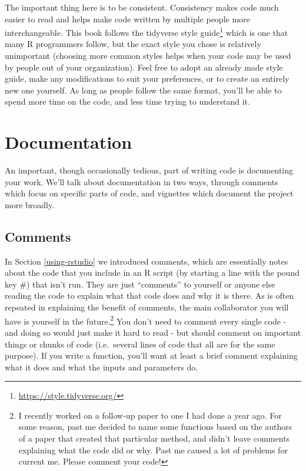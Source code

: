 \documentclass[
]{krantz}
\renewcommand{\href}[2]{#2\footnote{\url{#1}}}
\begin{document}
The important thing here is to be consistent. Consistency makes code much easier to read and helps make code written by multiple people more interchangeable. This book follows the \href{https://style.tidyverse.org/}{tidyverse style guide} which is one that many R programmers follow, but the exact style you chose is relatively unimportant (choosing more common styles helps when your code may be used by people out of your organization). Feel free to adopt an already made style guide, make any modifications to suit your preferences, or to create an entirely new one yourself. As long as people follow the same format, you'll be able to spend more time on the code, and less time trying to understand it.

\hypertarget{documentation}{%
\section{Documentation}\label{documentation}}

An important, though occasionally tedious, part of writing code is documenting your work. We'll talk about documentation in two ways, through comments which focus on specific parts of code, and vignettes which document the project more broadly.

\hypertarget{comments}{%
\subsection{Comments}\label{comments}}

In Section \ref{using-rstudio} we introduced comments, which are essentially notes about the code that you include in an R script (by starting a line with the pound key \#) that isn't run. They are just ``comments'' to yourself or anyone else reading the code to explain what that code does and why it is there. As is often repeated in explaining the benefit of comments, the main collaborator you will have is yourself in the future.\footnote{I recently worked on a follow-up paper to one I had done a year ago. For some reason, past me decided to name some functions based on the authors of a paper that created that particular method, and didn't leave comments explaining what the code did or why. Past me caused a lot of problems for current me. Please comment your code!} You don't need to comment every single code - and doing so would just make it hard to read - but should comment on important things or chunks of code (i.e.~several lines of code that all are for the same purpose). If you write a function, you'll want at least a brief comment explaining what it does and what the inputs and parameters do.
\end{document}
